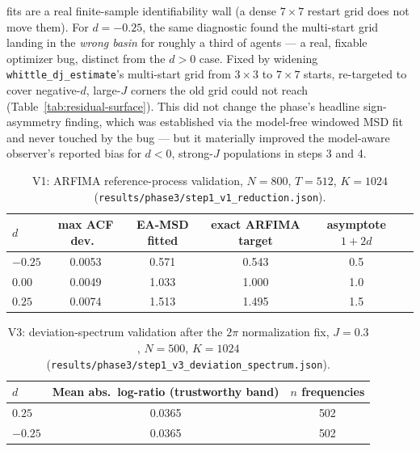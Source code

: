 \documentclass[11pt]{article}
\newcommand{\code}[1]{\texttt{#1}}
\begin{document}
\begin{description}[leftmargin=1.4em, style=nextline]
  fits are a real finite-sample identifiability wall (a dense $7\times7$
  restart grid does not move them). For $d{=}-0.25$, the same diagnostic
  found the multi-start grid landing in the \emph{wrong basin} for roughly a
  third of agents --- a real, fixable optimizer bug, distinct from the
  $d>0$ case. Fixed by widening \code{whittle\_dj\_estimate}'s multi-start
  grid from $3\times3$ to $7\times7$ starts, re-targeted to cover negative-$d$,
  large-$J$ corners the old grid could not reach
  (Table~\ref{tab:residual-surface}). This did not change the phase's
  headline sign-asymmetry finding, which was established via the model-free
  windowed MSD fit and never touched by the bug --- but it materially
  improved the model-aware observer's reported bias for $d<0$, strong-$J$
  populations in steps 3 and 4.
\end{description}

\begin{table}[htbp]
\centering
\caption{V1: ARFIMA reference-process validation, $N{=}800$, $T{=}512$,
$K{=}1024$ (\code{results/phase3/step1\_v1\_reduction.json}).}
\label{tab:v1}
\begin{tabular}{lccccc}
\toprule
$d$ & max ACF dev.\ & EA-MSD fitted & exact ARFIMA target & asymptote $1{+}2d$ \\
\midrule
$-0.25$ & 0.0053 & 0.571 & 0.543 & 0.5 \\
$0.00$ & 0.0049 & 1.033 & 1.000 & 1.0 \\
$0.25$ & 0.0074 & 1.513 & 1.495 & 1.5 \\
\bottomrule
\end{tabular}
\end{table}

\begin{table}[htbp]
\centering
\caption{V3: deviation-spectrum validation after the $2\pi$ normalization
fix, $J{=}0.3$, $N{=}500$, $K{=}1024$
(\code{results/phase3/step1\_v3\_deviation\_spectrum.json}).}
\label{tab:v3}
\begin{tabular}{lcc}
\toprule
$d$ & Mean abs.\ log-ratio (trustworthy band) & $n$ frequencies \\
\midrule
$0.25$ & 0.0365 & 502 \\
$-0.25$ & 0.0365 & 502 \\
\bottomrule
\end{tabular}
\end{table}
\end{document}

